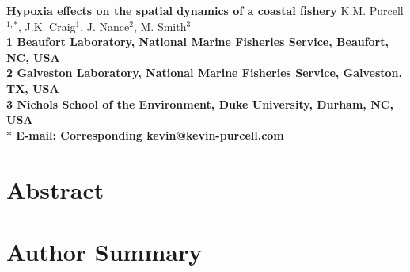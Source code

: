 \documentclass[10pt]{article}
\date{}
\begin{document}
\begin{flushleft}
{\Large
\textbf{Hypoxia effects on the spatial dynamics of a coastal fishery}
}
\vspace{10mm}
K.M. Purcell$^{1,\ast}$, 
J.K. Craig$^{1}$, 
J. Nance$^{2}$,
M. Smith$^{3}$
\vspace{5mm}
\\
\bf{1} Beaufort Laboratory, National Marine Fisheries Service, Beaufort, NC, USA
\\
\bf{2} Galveston Laboratory, National Marine Fisheries Service, Galveston, TX, USA
\\
\bf{3} Nichols School of the Environment, Duke University, Durham, NC, USA
\\
$\ast$ E-mail: Corresponding kevin@kevin-purcell.com
\end{flushleft}

\section*{Abstract}

\section*{Author Summary}
\end{document}
